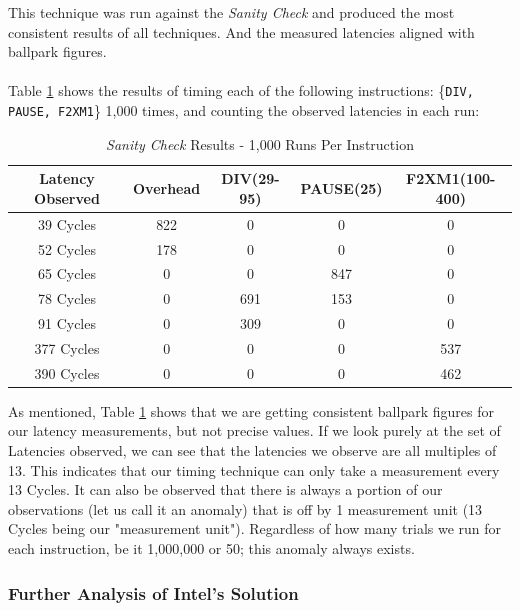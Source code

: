 \documentclass[bsc,frontabs,twoside,singlespacing,parskip,deptreport]{infthesis}     %
\begin{document}
This technique was run against the \textit{Sanity Check} and produced the most consistent results of all techniques. And the measured latencies aligned with ballpark figures.\\
\\
Table \ref{fig:sanity-results} shows the results of timing each of the following instructions: \{\texttt{DIV, PAUSE, F2XM1}\} 1,000 times, and counting the observed latencies in each run:
\begin{table}[!h]
\begin{center}
\caption{\textit{Sanity Check} Results - 1,000 Runs Per Instruction}
\label{fig:sanity-results}
\begin{tabular}{ |c||c|c|c|c| } 
    \hline
    Latency Observed & Overhead & DIV(29-95) & PAUSE(25) & F2XM1(100-400) \\
    \hline
    39 Cycles  & 822 & 0   & 0   & 0   \\
    52 Cycles  & 178 & 0   & 0   & 0   \\
    65 Cycles  & 0   & 0   & 847 & 0   \\
    78 Cycles  & 0   & 691 & 153 & 0   \\
    91 Cycles  & 0   & 309 & 0   & 0   \\
    377 Cycles & 0   & 0   & 0   & 537 \\
    390 Cycles & 0   & 0   & 0   & 462 \\
    \hline
\end{tabular}
\end{center}
\end{table}

\newpage

As mentioned, Table \ref{fig:sanity-results} shows that we are getting consistent ballpark figures for our latency measurements, but not precise values. If we look purely at the set of Latencies observed, we can see that the latencies we observe are all multiples of 13. This indicates that our timing technique can only take a measurement every 13 Cycles. It can also be observed that there is always a portion of our observations (let us call it an anomaly) that is off by 1 measurement unit (13 Cycles being our "measurement unit"). Regardless of how many trials we run for each instruction, be it 1,000,000 or 50; this anomaly always exists.


\subsubsection{Further Analysis of Intel's Solution}
\end{document}

